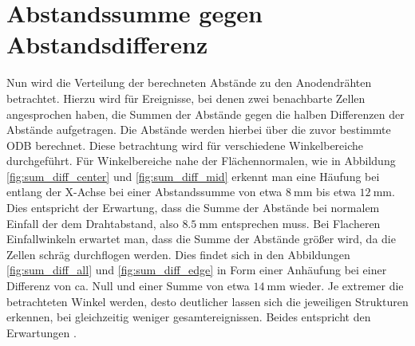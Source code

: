 \chapter{Abstandssumme gegen Abstandsdifferenz}
\label{sec:sumdiff}
Nun wird die Verteilung der berechneten Abstände zu den Anodendrähten betrachtet. Hierzu wird für Ereignisse, bei denen zwei benachbarte Zellen angesprochen haben, die Summen der Abstände gegen die halben Differenzen der Abstände aufgetragen. Die Abstände werden hierbei über die zuvor bestimmte ODB berechnet. Diese betrachtung wird für verschiedene Winkelbereiche durchgeführt. Für Winkelbereiche nahe der Flächennormalen, wie in Abbildung \ref{fig:sum_diff_center} und \ref{fig:sum_diff_mid} erkennt man eine Häufung bei entlang der X-Achse bei einer Abstandssumme von etwa $\SI{8}{\milli\meter}$ bis etwa $\SI{12}{\milli\meter}$. Dies entspricht der Erwartung, dass die Summe der Abstände bei normalem Einfall der dem Drahtabstand, also $\SI{8.5}{\milli\meter}$ entsprechen muss. Bei Flacheren Einfallwinkeln erwartet man, dass die Summe der Abstände größer wird, da die Zellen schräg durchflogen werden. Dies findet sich in den Abbildungen \ref{fig:sum_diff_all} und \ref{fig:sum_diff_edge} in Form einer Anhäufung bei einer Differenz von ca. Null und einer Summe von etwa $\SI{14}{\milli\meter}$ wieder. Je extremer die betrachteten Winkel werden, desto deutlicher lassen sich die jeweiligen Strukturen erkennen, bei gleichzeitig weniger gesamtereignissen. Beides entspricht den Erwartungen \cite{hammanndiplom}.

